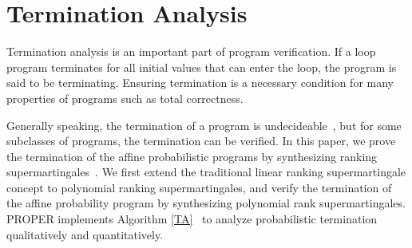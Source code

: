 \documentclass[runningheads]{llncs}
\begin{document}
\section{Termination Analysis}
Termination analysis is an important part of program verification. If a loop program terminates for all initial values that can enter the loop, the program is said to be terminating.  Ensuring termination is a necessary condition for many properties of programs such as total correctness. 

Generally speaking, the termination of a program is undecideable~\cite{Turing1936On}, but for some subclasses of programs, the termination can be verified. In this paper, we prove the termination of the affine probabilistic programs by synthesizing ranking supermartingales~\cite{Chakarov2013Martingales}. We first extend the traditional linear ranking supermartingale concept to polynomial ranking supermartingales, and verify the termination of the affine probability program by synthesizing polynomial rank supermartingales. PROPER implements Algorithm \ref{TA}~\cite{kris2016termination,cha2015algorithmic} to analyze probabilistic termination qualitatively and quantitatively. 
\end{document}
